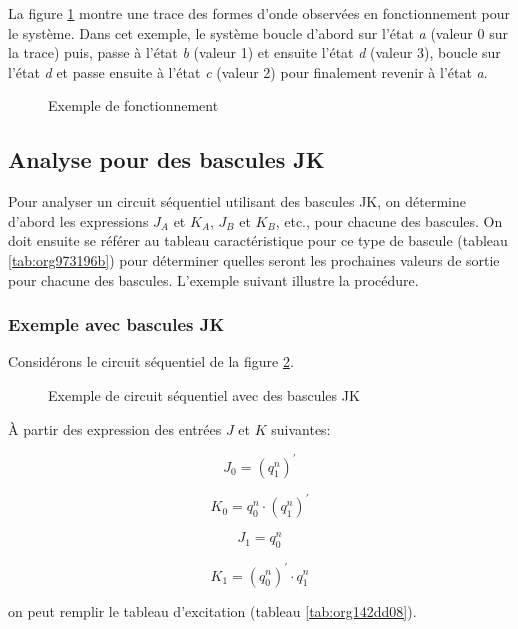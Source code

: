 \documentclass[11pt]{article}
\begin{document}
\begin{enumerate}
La figure \ref{fig:org5a27c37} montre une trace des formes d'onde
observées en fonctionnement pour le système. Dans cet exemple, le
système boucle d'abord sur l'état \emph{a} (valeur 0 sur la trace) puis,
passe à l'état \emph{b} (valeur 1) et ensuite l'état \emph{d} (valeur 3),
boucle sur l'état \emph{d} et passe ensuite à l'état \emph{c} (valeur 2) pour
finalement revenir à l'état \emph{a}.

\begin{figure}[htbp]
\centering

\caption{\label{fig:org5a27c37}Exemple de fonctionnement}
\end{figure}
\end{enumerate}

\subsection{Analyse pour des bascules JK}
\label{sec:org1c378bb}

Pour analyser un circuit séquentiel utilisant des bascules JK, on
détermine d'abord les expressions \(J_A\) et \(K_A\), \(J_B\) et
\(K_B\), etc., pour chacune des bascules. On doit ensuite se référer
au tableau caractéristique pour ce type de bascule (tableau
\ref{tab:org973196b}) pour déterminer quelles seront les prochaines valeurs
de sortie pour chacune des bascules. L'exemple suivant illustre la
procédure.

\subsubsection{Exemple avec bascules JK}
\label{sec:org571fd6e}
Considérons le circuit séquentiel de la figure \ref{fig:org35698e3}.

\begin{figure}[htbp]
\centering

\caption{\label{fig:org35698e3}Exemple de circuit séquentiel avec des bascules JK}
\end{figure}

À partir des expression des entrées \(J\) et \(K\) suivantes:

$$ J_0 = (q_1^{n})^\prime $$

$$ K_0 = q_0^{n} \cdot (q_1^{n})^\prime $$

$$ J_1 = q_0^{n} $$

$$ K_1 = (q_0^{n})^\prime \cdot q_1^{n} $$

on peut remplir le tableau d'excitation (tableau \ref{tab:org142dd08}).
\end{document}
